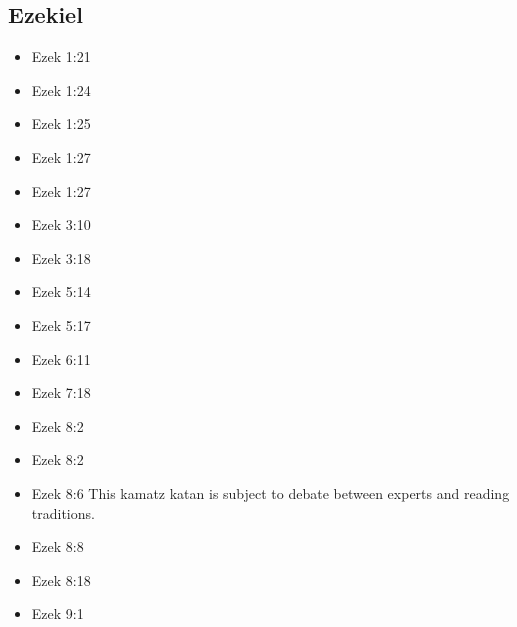 \documentclass[14pt]{article}
\begin{document}
						\subsection{Ezekiel}
					\begin{multicols}{2}\begin{itemize}
								
								\item Ezek 1:21
								
								\item Ezek 1:24
								
								\item Ezek 1:25
								
								\item Ezek 1:27
								
								\item Ezek 1:27
								
								\item Ezek 3:10
								
								\item Ezek 3:18
								
								\item Ezek 5:14
								
								\item Ezek 5:17
								
								\item Ezek 6:11
								
								\item Ezek 7:18
								
								\item Ezek 8:2
								
								\item Ezek 8:2
								
								\item Ezek 8:6 This kamatz katan is subject to debate between experts and reading traditions.
								
								\item Ezek 8:8
								
								\item Ezek 8:18
								
								\item Ezek 9:1
								

\end{itemize}
\end{multicols}
\end{document}
